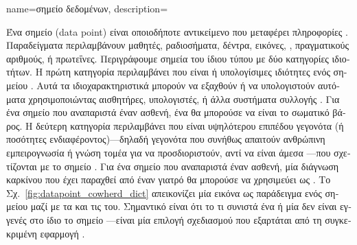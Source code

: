 {name={\foreignlanguage{greek}{σημείο δεδομένων}},
	description={\foreignlanguage{greek}{Ένα σημείο}  
		(data point) \foreignlanguage{greek}{είναι οποιοδήποτε αντικείμενο που μεταφέρει πληροφορίες} \cite{coverthomas}. 
		\foreignlanguage{greek}{Παραδείγματα περιλαμβάνουν μαθητές, ραδιοσήματα, δέντρα, εικόνες,} , 
		\foreignlanguage{greek}{πραγματικούς αριθ\-μούς, ή πρωτεΐνες. Περιγράφουμε σημεία}  
		\foreignlanguage{greek}{του ίδιου τύπου με δύο κατηγορίες ιδιοτήτων.} 
		\foreignlanguage{greek}{Η πρώτη κατηγορία περιλαμβάνει}  \foreignlanguage{greek}{που είναι}  
		 \foreignlanguage{greek}{ή υπολογίσιμες ιδιότητες ενός σημείου} . 
    		\foreignlanguage{greek}{Αυτά τα ιδιοχαρακτηριστικά μπορούν να εξαχθούν ή να υπολογιστούν αυτόματα χρησιμοποιώντας 
		αισθητήρες, υπολογιστές, ή άλλα συστήματα συλλογής} . \foreignlanguage{greek}{Για ένα σημείο}  
		 \foreignlanguage{greek}{που αναπαριστά έναν ασθενή, ένα}  
		\foreignlanguage{greek}{θα μπορούσε να είναι το σωματικό βάρος. Η δεύτερη κατηγορία περιλαμβάνει} 
		 \foreignlanguage{greek}{που είναι υψηλότερου επιπέδου γεγονότα (ή ποσότητες ενδιαφέροντος)—δηλαδή 
		γεγονότα που συνήθως απαιτούν ανθρώπινη εμπειρογνωσία ή γνώση τομέα για να προσδιοριστούν, αντί να είναι άμεσα}
		—\foreignlanguage{greek}{που σχετίζονται με το σημείο} . \foreignlanguage{greek}{Για 
		ένα σημείο}  \foreignlanguage{greek}{που αναπαριστά έναν ασθενή, μία διάγνωση καρκίνου που έχει παραχθεί 
		από έναν γιατρό θα μπορούσε να χρησιμεύει ως} . \foreignlanguage{greek}{Το Σχ.}\ \ref{fig:datapoint_cowherd_dict} 
		\foreignlanguage{greek}{απεικονίζει μία εικόνα ως παράδειγμα ενός σημείου}  \foreignlanguage{greek}{μαζί με τα} 
		 \foreignlanguage{greek}{και τις}  \foreignlanguage{greek}{του. Σημαντικό είναι ότι το τι 
		συνιστά ένα}  \foreignlanguage{greek}{ή μία}  \foreignlanguage{greek}{δεν είναι εγγενές στο 
		ίδιο το σημείο} —\foreignlanguage{greek}{είναι μία επιλογή σχεδιασμού που εξαρτάται από τη συγκεκριμένη 
		εφαρμογή} .
		\begin{figure}[H]
    		\centering

\end{figure}}}
